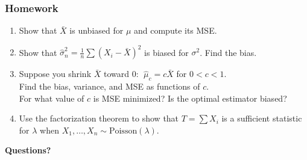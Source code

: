 \documentclass[aspectratio=169]{beamer}
\begin{document}
\begin{frame}
\frametitle{Homework}
\begin{enumerate}
  \item Show that $\bar{X}$ is unbiased for $\mu$ and compute its MSE.

  \vspace{0.2cm}
  \item Show that $\hat\sigma^2_n = \frac{1}{n}\sum(X_i - \bar{X})^2$ is biased for $\sigma^2$. Find the bias.

  \vspace{0.2cm}
  \item Suppose you shrink $\bar{X}$ toward 0: $\;\hat\mu_c = c\bar{X}$ for $0 < c < 1$.\\
    Find the bias, variance, and MSE as functions of $c$.\\
    For what value of $c$ is MSE minimized? Is the optimal estimator biased?

  \vspace{0.2cm}
  \item Use the factorization theorem to show that $T = \sum X_i$ is a sufficient statistic\\
    for $\lambda$ when $X_1, \ldots, X_n \sim \text{Poisson}(\lambda)$.
\end{enumerate}
\end{frame}

\begin{frame}
\begin{center}
  {\Huge\bfseries\textcolor{popblue}{Questions?}}
\end{center}
\end{frame}
\end{document}
